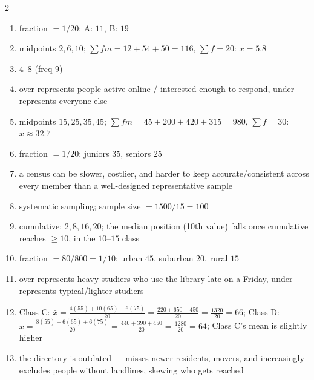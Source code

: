 \documentclass[11pt]{article}
\begin{document}
\begin{keybox}
\begin{multicols}{2}
\small
\begin{enumerate}[leftmargin=*,itemsep=3pt]
  \item fraction $=1/20$: A: $11$, B: $19$
  \item midpoints $2,6,10$; $\sum fm=12+54+50=116$, $\sum f=20$: $\bar x=5.8$
  \item $4$--$8$ (freq 9)
  \item over-represents people active online / interested enough to respond, under-represents everyone else
  \item midpoints $15,25,35,45$; $\sum fm=45+200+420+315=980$, $\sum f=30$: $\bar x\approx32.7$
  \item fraction $=1/20$: juniors $35$, seniors $25$
  \item a census can be slower, costlier, and harder to keep accurate/consistent across every member than a well-designed representative sample
  \item systematic sampling; sample size $=1500/15=100$
  \item cumulative: $2,8,16,20$; the median position (10th value) falls once cumulative reaches $\geq10$, in the $10$--$15$ class
  \item fraction $=80/800=1/10$: urban $45$, suburban $20$, rural $15$
  \item over-represents heavy studiers who use the library late on a Friday, under-represents typical/lighter studiers
  \item Class C: $\bar x=\tfrac{4(55)+10(65)+6(75)}{20}=\tfrac{220+650+450}{20}=\tfrac{1320}{20}=66$; Class D: $\bar x=\tfrac{8(55)+6(65)+6(75)}{20}=\tfrac{440+390+450}{20}=\tfrac{1280}{20}=64$; Class C's mean is slightly higher
  \item the directory is outdated --- misses newer residents, movers, and increasingly excludes people without landlines, skewing who gets reached
\end{enumerate}
\end{multicols}
\end{keybox}
\end{document}
